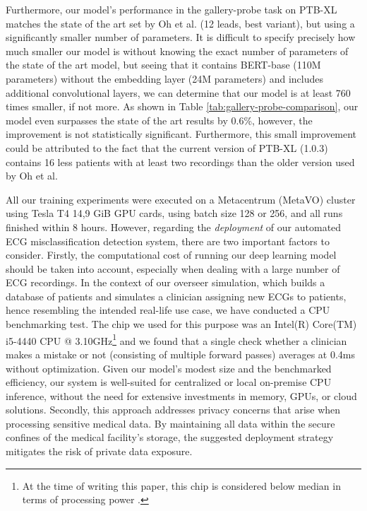 \documentclass[preprint,12pt]{elsarticle}
\begin{document}
Furthermore, our model's performance in the gallery-probe task on PTB-XL matches the state of the art set by Oh et al. \cite{oh2022lead} (12 leads, best variant), but using a significantly smaller number of parameters. It is difficult to specify precisely how much smaller our model is without knowing the exact number of parameters of the state of the art model, but seeing that it contains BERT-base (110M parameters) without the embedding layer (24M parameters) and includes additional convolutional layers, we can determine that our model is at least 760 times smaller, if not more.  As shown in Table \ref{tab:gallery-probe-comparison}, our model even surpasses the state of the art results by 0.6\%, however, the improvement is not statistically significant. Furthermore, this small improvement could be attributed to the fact that the current version of PTB-XL (1.0.3) contains 16 less patients with at least two recordings than the older version used by Oh et al.

All our training experiments were executed on a Metacentrum (MetaVO) cluster using Tesla T4 14,9 GiB GPU cards, using batch size 128 or 256, and all runs finished within 8 hours. However, regarding the \textit{deployment} of our automated ECG misclassification detection system, there are two important factors to consider. Firstly, the computational cost of running our deep learning model should be taken into account, especially when dealing with a large number of ECG recordings. In the context of our overseer simulation, which builds a database of patients and simulates a clinician assigning new ECGs to patients, hence resembling the intended real-life use case, we have conducted a CPU benchmarking test. The chip we used for this purpose was an Intel(R) Core(TM) i5-4440 CPU @ 3.10GHz\footnote{At the time of writing this paper, this chip is considered below median in terms of processing power \cite{cpu-benchmark}.} and we found that a single check whether a clinician makes a mistake or not (consisting of multiple forward passes) averages at 0.4ms without optimization. Given our model's modest size and the benchmarked efficiency, our system is well-suited for centralized or local on-premise CPU inference, without the need for extensive investments in memory, GPUs, or cloud solutions. Secondly, this approach addresses privacy concerns that arise when processing sensitive medical data. By maintaining all data within the secure confines of the medical facility's storage, the suggested deployment strategy mitigates the risk of private data exposure.
\end{document}

